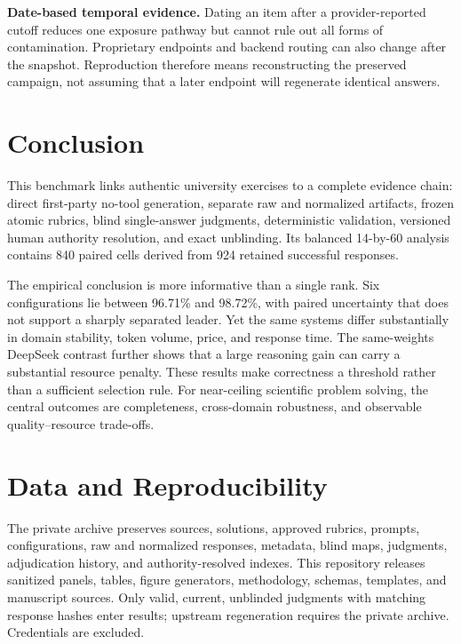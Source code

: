 \documentclass[11pt,a4paper,twocolumn]{article}
\begin{document}
\textbf{Date-based temporal evidence.}
Dating an item after a provider-reported cutoff reduces one exposure pathway
but cannot rule out all forms of
contamination. Proprietary endpoints and backend routing can also change after
the snapshot. Reproduction therefore means reconstructing the preserved
campaign, not assuming that a later endpoint will regenerate identical answers.

\section{Conclusion}

This benchmark links authentic university exercises to a complete evidence
chain: direct first-party no-tool generation, separate raw and normalized
artifacts, frozen atomic rubrics, blind single-answer judgments, deterministic
validation, versioned human authority resolution, and exact unblinding. Its
balanced 14-by-60 analysis contains 840 paired cells derived from 924 retained
successful responses.

The empirical conclusion is more informative than a single rank. Six
configurations lie between 96.71\% and 98.72\%, with paired uncertainty that
does not support a sharply separated leader. Yet the same systems differ
substantially in domain stability, token volume, price, and response time. The
same-weights DeepSeek contrast further shows that a large reasoning gain can
carry a substantial resource penalty. These results make correctness a
threshold rather than a sufficient selection rule. For near-ceiling scientific
problem solving, the central outcomes are completeness, cross-domain
robustness, and observable quality--resource trade-offs.

\section*{Data and Reproducibility}

The private archive preserves sources, solutions, approved rubrics, prompts,
configurations, raw and normalized responses, metadata, blind maps, judgments,
adjudication history, and authority-resolved indexes. This repository releases
sanitized panels, tables, figure generators, methodology, schemas, templates,
and manuscript sources. Only valid, current, unblinded judgments with matching
response hashes enter results; upstream regeneration requires the private
archive. Credentials are excluded.
\end{document}
